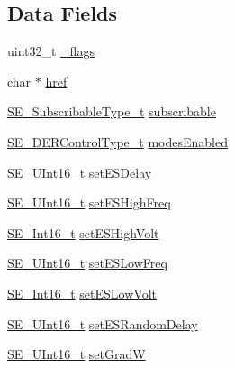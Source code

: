 \subsection*{Data Fields}
\begin{DoxyCompactItemize}
\item 
uint32\+\_\+t \hyperlink{group__DERSettings_ga2c1242ff7f135c60430a5604d2f1a83a}{\+\_\+flags}
\item 
char $\ast$ \hyperlink{group__DERSettings_gad6e6e2ae01c694650bbc075b9b188b83}{href}
\item 
\hyperlink{group__SubscribableType_ga5c41f553d369710ed34619266bf2551e}{S\+E\+\_\+\+Subscribable\+Type\+\_\+t} \hyperlink{group__DERSettings_gab98f5df1cc2b74bce92993f9b25a0331}{subscribable}
\item 
\hyperlink{group__DERControlType_gae0eefcd49e1cd98d709327c88f20a76b}{S\+E\+\_\+\+D\+E\+R\+Control\+Type\+\_\+t} \hyperlink{group__DERSettings_gaecab29deffa8f7119731d05b84fcc071}{modes\+Enabled}
\item 
\hyperlink{group__UInt16_gac68d541f189538bfd30cfaa712d20d29}{S\+E\+\_\+\+U\+Int16\+\_\+t} \hyperlink{group__DERSettings_gad664e0997c68f283b185484d139e6ad6}{set\+E\+S\+Delay}
\item 
\hyperlink{group__UInt16_gac68d541f189538bfd30cfaa712d20d29}{S\+E\+\_\+\+U\+Int16\+\_\+t} \hyperlink{group__DERSettings_ga7a857f8a4b6489b0d8ae60455b57e5ae}{set\+E\+S\+High\+Freq}
\item 
\hyperlink{group__Int16_ga0d600c7df811a7d4b4816e8965877690}{S\+E\+\_\+\+Int16\+\_\+t} \hyperlink{group__DERSettings_ga9e1a2f2b9469c0ee78fa18ecd81896ae}{set\+E\+S\+High\+Volt}
\item 
\hyperlink{group__UInt16_gac68d541f189538bfd30cfaa712d20d29}{S\+E\+\_\+\+U\+Int16\+\_\+t} \hyperlink{group__DERSettings_ga2fbc27ba03bb7454ea4f831a454b1687}{set\+E\+S\+Low\+Freq}
\item 
\hyperlink{group__Int16_ga0d600c7df811a7d4b4816e8965877690}{S\+E\+\_\+\+Int16\+\_\+t} \hyperlink{group__DERSettings_ga853797a5f4bfd6f027af1c57739b5574}{set\+E\+S\+Low\+Volt}
\item 
\hyperlink{group__UInt16_gac68d541f189538bfd30cfaa712d20d29}{S\+E\+\_\+\+U\+Int16\+\_\+t} \hyperlink{group__DERSettings_gabc0d530d1a2b90d4e8c32bed0b98a43d}{set\+E\+S\+Random\+Delay}
\item 
\hyperlink{group__UInt16_gac68d541f189538bfd30cfaa712d20d29}{S\+E\+\_\+\+U\+Int16\+\_\+t} \hyperlink{group__DERSettings_ga309dff8cb09ae5f058c2eaf57f0129b2}{set\+GradW}
\item 

\end{DoxyCompactItemize}
